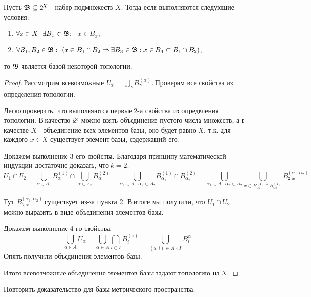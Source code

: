 \begin{lemma}
    Пусть $\mathfrak{B} \subseteq 2^X$ - набор подмножеств $X$. Тогда если выполняются следующие условия:
    \begin{enumerate}
        \item $\forall x \in X \ \ \exists B_x \in \mathfrak{B} $: \ $x \in B_x$,
        \item $\forall B_1, B_2 \in \mathfrak{B}: \ (x \in B_1 \cap B_2 \Rightarrow \exists B_3 \in \mathfrak{B} : x \in B_3 \subset B_1 \cap B_2)$, 
    \end{enumerate}
    то $\mathfrak{B}$ является базой некоторой топологии.
\end{lemma}
\begin{proof} %
    Рассмотрим всевозможные $U_{\alpha} = \bigcup_{\gamma} B_{\gamma}^{(\alpha)}$. Проверим все свойства из определения топологии.

    Легко проверить, что выполняются первые 2-а свойства из определения топологии. В качество $\varnothing$ можно взять объединение пустого числа множеств, а в качестве $X$ - объединение всех элементов базы, оно будет равно $X$, т.к. для каждого $x \in X$ существует элемент базы, содержащий его.

    Докажем выполнение 3-его свойства. Благодаря принципу математической индукции достаточно доказать, что $k = 2$.
    \[
        U_1 \cap U_2 = \bigcup_{\alpha \in A_1} B_{\alpha}^{(1)} \cap \bigcup_{\alpha \in A_2} B_{\alpha}^{(2)} = \bigcup_{\alpha_1 \in A_1, \alpha_2 \in A_2} B_{\alpha_1}^{(1)} \cap B_{\alpha_2}^{(2)} = \bigcup_{\alpha_1 \in A_1, \alpha_2 \in A_2} \bigcup_{x \in B_{\alpha_1}^{(1)} \cap B_{\alpha_2}^{(2)}} B_{3, x}^{(\alpha_1, \alpha_2)}
    \]

    Тут $B_{3, x}^{(\alpha_1, \alpha_2)}$ существует из-за пункта 2. В итоге мы получили, что $U_1 \cap U_2$ можно выразить в виде объединения элементов базы.
    
    Докажем выполнение 4-го свойства.
    \[
        \bigcup_{\alpha \in A} U_{\alpha} = \bigcup_{\alpha \in A} \bigcap_{i \in I} B_i^{(\alpha)} = \bigcup_{(\alpha, i) \in A \times I} B_i^{\alpha}
    \]
    Опять получили объединения элементов базы.

    Итого всевозможные объединение элементов базы задают топологию на $X$.
\end{proof}

\begin{exercise}
    Повторить доказательство для базы метрического пространства.
\end{exercise}

